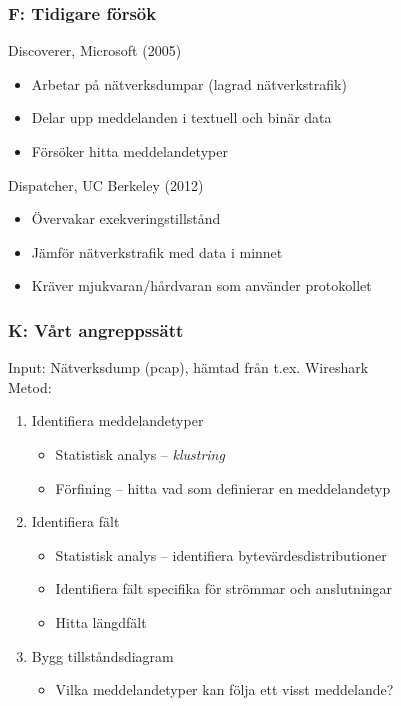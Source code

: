 \documentclass[xetex, 8pt]{beamer}
\begin{document}
    \begin{frame}
        \frametitle{F: Tidigare försök}
        Discoverer, Microsoft (2005)
        \begin{itemize}
            \item Arbetar på nätverksdumpar (lagrad nätverkstrafik)
            \item Delar upp meddelanden i textuell och binär data
            \item Försöker hitta meddelandetyper
        \end{itemize}
        \vskip20pt
        Dispatcher, UC Berkeley (2012)
        \begin{itemize}
            \item Övervakar exekveringstillstånd
            \item Jämför nätverkstrafik med data i minnet
            \item Kräver mjukvaran/hårdvaran som använder protokollet
        \end{itemize}
    \end{frame}

    \begin{frame}
        \frametitle{K: Vårt angreppssätt}
        Input: Nätverksdump (pcap), hämtad från t.ex. Wireshark\\
        Metod:
        \begin{enumerate}
            \item Identifiera meddelandetyper
                \begin{itemize}
                    \item Statistisk analys -- \emph{klustring}
                    \item Förfining -- hitta vad som definierar en meddelandetyp
                \end{itemize}
            \item Identifiera fält
                \begin{itemize}
                    \item Statistisk analys -- identifiera bytevärdesdistributioner
                    \item Identifiera fält specifika för strömmar och anslutningar
                    \item Hitta längdfält
                \end{itemize}
            \item Bygg tillståndsdiagram
                \begin{itemize}
                    \item Vilka meddelandetyper kan följa ett visst meddelande?
                \end{itemize}
        \end{enumerate}
    \end{frame}
    
\end{document}
